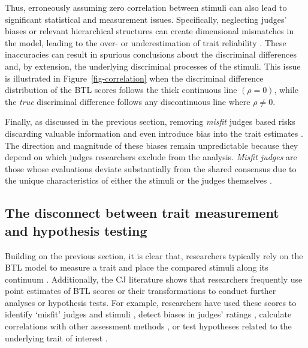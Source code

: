 \documentclass[
  authoryear,
  review,
  1p]{elsarticle}
\begin{document}
Thus, erroneously assuming zero correlation between stimuli can also
lead to significant statistical and measurement issues. Specifically,
neglecting judges' biases or relevant hierarchical structures can create
dimensional mismatches in the model, leading to the over- or
underestimation of trait reliability \citep[pp.~341,
482]{Ackerman_1989, Hoyle_et_al_2023}. These inaccuracies can result in
spurious conclusions about the discriminal differences
\citep[pp.~370]{McElreath_2020} and, by extension, the underlying
discriminal processes of the stimuli. This issue is illustrated in
Figure~\ref{fig-correlation} when the discriminal difference
distribution of the BTL scores follows the thick continuous line
\((\rho = 0)\), while the \emph{true} discriminal difference follows any
discontinuous line where \(\rho \neq 0\).

Finally, as discussed in the previous section, removing \emph{misfit}
judges based risks discarding valuable information and even introduce
bias into the trait estimates
\citep[chap.~12]{Zimmerman_1994, McElreath_2020}. The direction and
magnitude of these biases remain unpredictable because they depend on
which judges researchers exclude from the analysis. \emph{Misfit judges}
are those whose evaluations deviate substantially from the shared
consensus due to the unique characteristics of either the stimuli or the
judges themselves
\citetext{\citealp[pp.~164-165]{Pollitt_2012a}; \citealp[pp.~289-290]{Pollitt_2012b}; \citealp[pp.~4]{vanDaal_et_al_2016}; \citealp[pp.~20]{Goossens_et_al_2018}}.

\subsection{The disconnect between trait measurement and hypothesis
testing}\label{sec-theory-issue2}

Building on the previous section, it is clear that, researchers
typically rely on the BTL model to measure a trait and place the
compared stimuli along its continuum \citep[pp.~269]{Thurstone_1927b}.
Additionally, the CJ literature shows that researchers frequently use
point estimates of BTL scores or their transformations to conduct
further analyses or hypothesis tests. For example, researchers have used
these scores to identify `misfit' judges and stimuli
\citep{Pollitt_2012b, vanDaal_et_al_2016, Goossens_et_al_2018}, detect
biases in judges' ratings \citep{Pollitt_et_al_2003, Pollitt_2012b},
calculate correlations with other assessment methods
\citep{Goossens_et_al_2018, Bouwer_et_al_2023}, or test hypotheses
related to the underlying trait of interest
\citep{Casalicchio_et_al_2015, Bramley_et_al_2019, Boonen_et_al_2020, Bouwer_et_al_2023, vanDaal_et_al_2017, Jones_et_al_2019, Gijsen_et_al_2021}.
\end{document}
